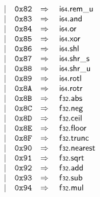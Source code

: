 $$\begin{array}[t]{@{}lrrl@{}l@{}l@{}l@{}}
& & | & \mathtt{0x82} & \quad\Rightarrow\quad{} & \mathsf{i{\scriptstyle 64}} {.} {\mathsf{rem}}{\mathsf{\_}}{\mathsf{u}} \\
& & | & \mathtt{0x83} & \quad\Rightarrow\quad{} & \mathsf{i{\scriptstyle 64}} {.} \mathsf{and} \\
& & | & \mathtt{0x84} & \quad\Rightarrow\quad{} & \mathsf{i{\scriptstyle 64}} {.} \mathsf{or} \\
& & | & \mathtt{0x85} & \quad\Rightarrow\quad{} & \mathsf{i{\scriptstyle 64}} {.} \mathsf{xor} \\
& & | & \mathtt{0x86} & \quad\Rightarrow\quad{} & \mathsf{i{\scriptstyle 64}} {.} \mathsf{shl} \\
& & | & \mathtt{0x87} & \quad\Rightarrow\quad{} & \mathsf{i{\scriptstyle 64}} {.} {\mathsf{shr}}{\mathsf{\_}}{\mathsf{s}} \\
& & | & \mathtt{0x88} & \quad\Rightarrow\quad{} & \mathsf{i{\scriptstyle 64}} {.} {\mathsf{shr}}{\mathsf{\_}}{\mathsf{u}} \\
& & | & \mathtt{0x89} & \quad\Rightarrow\quad{} & \mathsf{i{\scriptstyle 64}} {.} \mathsf{rotl} \\
& & | & \mathtt{0x8A} & \quad\Rightarrow\quad{} & \mathsf{i{\scriptstyle 64}} {.} \mathsf{rotr} \\
& & | & \mathtt{0x8B} & \quad\Rightarrow\quad{} & \mathsf{f{\scriptstyle 32}} {.} \mathsf{abs} \\
& & | & \mathtt{0x8C} & \quad\Rightarrow\quad{} & \mathsf{f{\scriptstyle 32}} {.} \mathsf{neg} \\
& & | & \mathtt{0x8D} & \quad\Rightarrow\quad{} & \mathsf{f{\scriptstyle 32}} {.} \mathsf{ceil} \\
& & | & \mathtt{0x8E} & \quad\Rightarrow\quad{} & \mathsf{f{\scriptstyle 32}} {.} \mathsf{floor} \\
& & | & \mathtt{0x8F} & \quad\Rightarrow\quad{} & \mathsf{f{\scriptstyle 32}} {.} \mathsf{trunc} \\
& & | & \mathtt{0x90} & \quad\Rightarrow\quad{} & \mathsf{f{\scriptstyle 32}} {.} \mathsf{nearest} \\
& & | & \mathtt{0x91} & \quad\Rightarrow\quad{} & \mathsf{f{\scriptstyle 32}} {.} \mathsf{sqrt} \\
& & | & \mathtt{0x92} & \quad\Rightarrow\quad{} & \mathsf{f{\scriptstyle 32}} {.} \mathsf{add} \\
& & | & \mathtt{0x93} & \quad\Rightarrow\quad{} & \mathsf{f{\scriptstyle 32}} {.} \mathsf{sub} \\
& & | & \mathtt{0x94} & \quad\Rightarrow\quad{} & \mathsf{f{\scriptstyle 32}} {.} \mathsf{mul} \\

\end{array}$$
